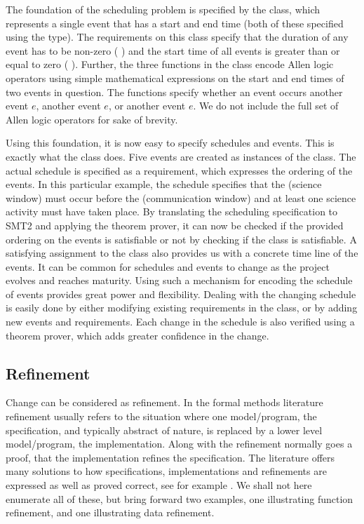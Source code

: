 The foundation of the scheduling problem is specified by the
 class, which represents a single event that has a start
and end time (both of these specified using the  type). The
requirements on this class specify that the duration of any event has
to be non-zero ( ) and the start time
of all events is greater than or equal to zero (
). Further, the three functions in the 
class encode Allen logic operators \cite{allen-logic-84} 
using simple mathematical
expressions on the start and end times of two events in
question. The functions specify whether an event occurs
 another event $e$,  another event $e$, or
 another event $e$. We do not include the full set of
Allen logic operators for sake of brevity. 

Using this foundation, it is now easy to specify schedules and
events. This is exactly what the  class does. Five
events are created as instances of the  class. The actual
schedule is specified as a requirement, which expresses the ordering
of the events. In this particular example, the schedule specifies that
the  (science window) must occur before the
 (communication window) and at least one science
activity must have taken place. By translating the scheduling
specification to SMT2 and applying the \zthree{} theorem prover, it
can now be checked if the provided ordering on the events is
satisfiable or not by checking if the  class is
satisfiable. A satisfying assignment to the class also provides us
with a concrete time line of the events.  It can be common for
schedules and events to change as the project evolves and reaches
maturity. Using such a mechanism for encoding the schedule of events
provides great power and flexibility. Dealing with the changing
schedule is easily done by either modifying existing requirements 
in the  class, or by adding new events and
requirements. Each change in the schedule is also verified using a
theorem prover, which adds greater confidence in the change.


\subsection{Refinement}

Change can be considered as refinement. In the formal methods literature
refinement usually refers to the situation where one model/program, the 
specification, and typically abstract of nature, is replaced by a lower 
level model/program, the implementation. Along with the refinement normally
goes a proof, that the implementation refines the specification.
The literature offers many solutions to how specifications, implementations and 
refinements are expressed as well as proved correct, see for example 
\cite{vdm,raise92,george-raise-2008}. We shall not here enumerate all of these, but bring forward two examples, one illustrating function refinement, and one illustrating data refinement.

